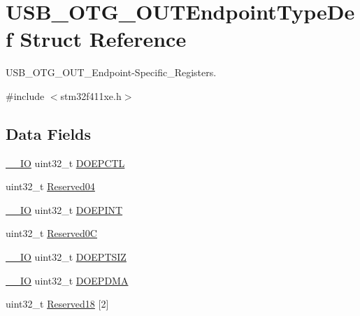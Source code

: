 \hypertarget{struct_u_s_b___o_t_g___o_u_t_endpoint_type_def}{}\section{U\+S\+B\+\_\+\+O\+T\+G\+\_\+\+O\+U\+T\+Endpoint\+Type\+Def Struct Reference}
\label{struct_u_s_b___o_t_g___o_u_t_endpoint_type_def}


U\+S\+B\+\_\+\+O\+T\+G\+\_\+\+O\+U\+T\+\_\+\+Endpoint-\/\+Specific\+\_\+\+Registers.  




{\ttfamily \#include $<$stm32f411xe.\+h$>$}

\subsection*{Data Fields}
\begin{DoxyCompactItemize}
\item 
\hyperlink{core__sc300_8h_aec43007d9998a0a0e01faede4133d6be}{\+\_\+\+\_\+\+IO} uint32\+\_\+t \hyperlink{struct_u_s_b___o_t_g___o_u_t_endpoint_type_def_a86a62895d4b90531c30f5a48f404ddea}{D\+O\+E\+P\+C\+TL}
\item 
uint32\+\_\+t \hyperlink{struct_u_s_b___o_t_g___o_u_t_endpoint_type_def_a76533e00218c269a8064cf68c3daf7e9}{Reserved04}
\item 
\hyperlink{core__sc300_8h_aec43007d9998a0a0e01faede4133d6be}{\+\_\+\+\_\+\+IO} uint32\+\_\+t \hyperlink{struct_u_s_b___o_t_g___o_u_t_endpoint_type_def_a0b8b826828cba51585aabe9b73074d07}{D\+O\+E\+P\+I\+NT}
\item 
uint32\+\_\+t \hyperlink{struct_u_s_b___o_t_g___o_u_t_endpoint_type_def_a1d7bc9b546c4dd8ce2fe792945cf7a9d}{Reserved0C}
\item 
\hyperlink{core__sc300_8h_aec43007d9998a0a0e01faede4133d6be}{\+\_\+\+\_\+\+IO} uint32\+\_\+t \hyperlink{struct_u_s_b___o_t_g___o_u_t_endpoint_type_def_a5e4876bb58a4a01eacf675b69f36df26}{D\+O\+E\+P\+T\+S\+IZ}
\item 
\hyperlink{core__sc300_8h_aec43007d9998a0a0e01faede4133d6be}{\+\_\+\+\_\+\+IO} uint32\+\_\+t \hyperlink{struct_u_s_b___o_t_g___o_u_t_endpoint_type_def_a189d59fa4e34c96ce7eb25c0afd50cd7}{D\+O\+E\+P\+D\+MA}
\item 
uint32\+\_\+t \hyperlink{struct_u_s_b___o_t_g___o_u_t_endpoint_type_def_a51b162457add1bb7cc254b7aeb9f94bd}{Reserved18} \mbox{[}2\mbox{]}
\end{DoxyCompactItemize}



